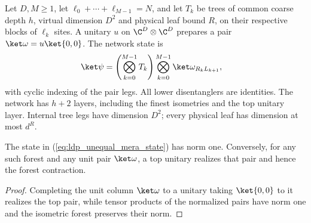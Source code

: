 \begin{definition}
    \label{def:ldp_unequal_mera}
    \leanok
    Let $D,M\ge1$, let $\ell_0+\cdots+\ell_{M-1}=N$, and let $T_k$
    be trees of common coarse depth $h$, virtual dimension $D^2$ and
    physical leaf bound $R$, on their respective blocks of $\ell_k$
    sites. A unitary $u$ on $\C^D\otimes\C^D$ prepares a pair
    $\ket\omega=u\ket{0,0}$. The network state is
    \begin{align}
        \ket\psi
         & =\left(\bigotimes_{k=0}^{M-1}T_k\right)
        \bigotimes_{k=0}^{M-1}\ket\omega_{R_kL_{k+1}},
        \label{eq:ldp_unequal_mera_state}
    \end{align}
    with cyclic indexing of the pair legs. All lower disentanglers
    are identities. The network has $h+2$ layers, including the finest
    isometries and the top unitary layer. Internal tree legs have
    dimension $D^2$; every physical leaf has dimension at most $d^R$.
\end{definition}

\begin{lemma}
    \label{thm:ldp_unequal_mera_norm}
    \leanok
    The state in (\ref{eq:ldp_unequal_mera_state}) has norm one.
    Conversely, for any such forest and any unit pair $\ket\omega$,
    a top unitary realizes that pair and hence the forest contraction.
\end{lemma}
\begin{proof}
    \leanok
    Completing the unit column $\ket\omega$ to a unitary taking
    $\ket{0,0}$ to it realizes the top pair, while tensor products of the
    normalized pairs have norm one and the isometric forest preserves
    their norm.
\end{proof}

